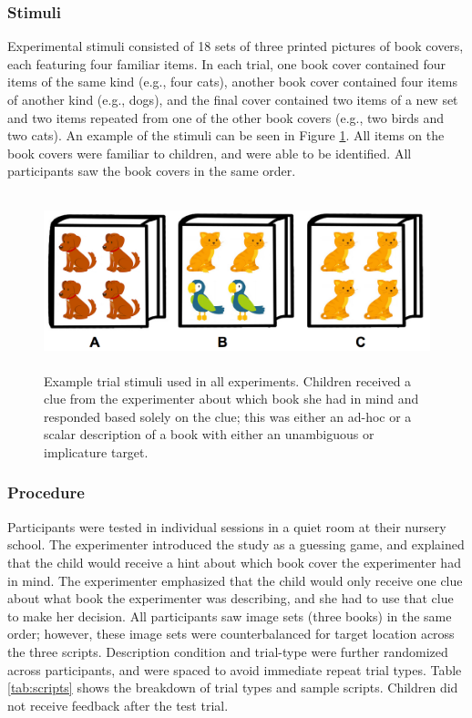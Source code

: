 \documentclass[man]{apa2}
\begin{document}

\subsubsection{Stimuli}

Experimental stimuli consisted of 18 sets of three printed pictures of book covers, each featuring four familiar items. In each trial, one book cover contained four items of the same kind (e.g., four cats), another book cover contained four items of another kind (e.g., dogs), and the final cover contained two items of a new set and two items repeated from one of the other book covers (e.g., two birds and two cats). An example of the stimuli can be seen in Figure \ref{fig:demo}. All items on the book covers were familiar to children, and were able to be identified. All participants saw the book covers in the same order.

\begin{figure}
 \begin{center}
  \includegraphics[height=2in]{figures/implicatures_demo_letters.png}
  \caption{\label{fig:demo} Example trial stimuli used in all experiments. Children received a clue from the experimenter about which book she had in mind and responded based solely on the clue; this was either an ad-hoc or a scalar description of a book with either an unambiguous or implicature target.}
 \end{center}
\end{figure}

\subsubsection{Procedure}

Participants were tested in individual sessions in a quiet room at their nursery school. The experimenter introduced the study as a guessing game, and explained that the child would receive a hint about which book cover the experimenter had in mind. The experimenter emphasized that the child would only receive one clue about what book the experimenter was describing, and she had to use that clue to make her decision. All participants saw image sets (three books) in the same order; however, these image sets were counterbalanced for target location across the three scripts. Description condition and trial-type were further randomized across participants, and were spaced to avoid immediate repeat trial types. Table \ref{tab:scripts} shows the breakdown of trial types and sample scripts. Children did not receive feedback after the test trial.
\end{document}

